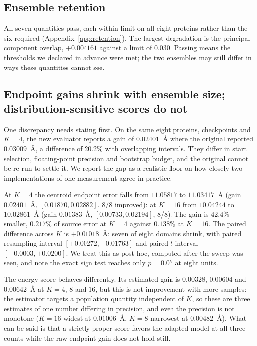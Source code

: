 \documentclass{article}
\begin{document}
\subsection{Ensemble retention}

All seven quantities pass, each within limit on all eight proteins rather than the six required (Appendix~\ref{app:retention}). The largest degradation is the principal-component overlap, $+0.004161$ against a limit of $0.030$. Passing means the thresholds we declared in advance were met; the two ensembles may still differ in ways these quantities cannot see.


\subsection{Endpoint gains shrink with ensemble size; distribution-sensitive scores do not}
\label{sec:sampling}

One discrepancy needs stating first. On the same eight proteins, checkpoints and $K=4$, the new evaluator reports a gain of $0.02401$~\AA{} where the original reported $0.03009$~\AA{}, a difference of 20.2\% with overlapping intervals. They differ in start selection, floating-point precision and bootstrap budget, and the original cannot be re-run to settle it. We report the gap as a realistic floor on how closely two implementations of one measurement agree in practice.

At $K=4$ the centroid endpoint error falls from $11.05817$ to $11.03417$~\AA{} (gain $0.02401$~\AA{}, $[0.01870, 0.02882]$, 8/8 improved); at $K=16$ from $10.04244$ to $10.02861$~\AA{} (gain $0.01383$~\AA{}, $[0.00733, 0.02194]$, 8/8). The gain is 42.4\% smaller, $0.217\%$ of source error at $K=4$ against $0.138\%$ at $K=16$. The paired difference across $K$ is $+0.01018$~\AA{}: seven of eight domains shrink, with paired resampling interval $[+0.00272, +0.01763]$ and paired $t$ interval $[+0.0003, +0.0200]$. We treat this as post hoc, computed after the sweep was seen, and note the exact sign test reaches only $p=0.07$ at eight units.

The energy score behaves differently. Its estimated gain is $0.00328$, $0.00604$ and $0.00642$~\AA{} at $K=4$, $8$ and $16$, but this is not improvement with more samples: the estimator targets a population quantity independent of $K$, so these are three estimates of one number differing in precision, and even the precision is not monotone ($K=16$ widest at $0.01006$~\AA{}, $K=8$ narrowest at $0.00482$~\AA{}). What can be said is that a strictly proper score favors the adapted model at all three counts while the raw endpoint gain does not hold still.
\end{document}

